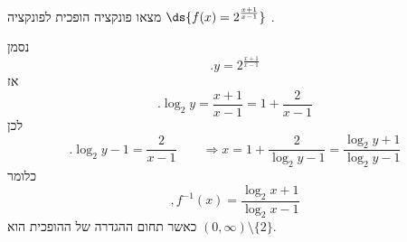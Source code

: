מצאו פונקציה הופכית לפונקציה
$\ds{f(x)=2^\frac{x+1}{x-1}}$
.

\begin{solbox}
נסמן
\[
.y=2^{\frac{x+1}{x-1}}
\]
אז
\[
.\log_2 y=\frac{x+1}{x-1}=1+\frac{2}{x-1}
\]
לכן
\[
.\log_2 y-1=\frac{2}{x-1}
\qquad
\Longrightarrow
x=1+\frac{2}{\log_2 y-1}
=\frac{\log_2 y+1}{\log_2 y-1}
\]
כלומר
\[
,f^{-1}(x)=\frac{\log_2 x+1}{\log_2 x-1}
\]
כאשר תחום ההגדרה של ההופכית הוא $(0,\infty)\setminus\{2\}$.
\end{solbox}
